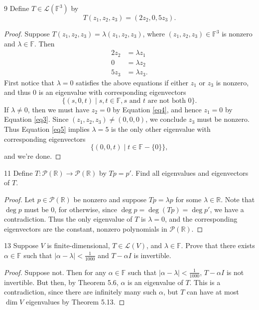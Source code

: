 \documentclass[11pt]{extarticle}
\newenvironment{problem}[1]{\begin{prob*}{#1}{}}{\end{prob*}}
\newcommand{\R}{\mathbb{R}}
\newcommand{\F}{\mathbb{F}}
\newcommand{\poly}{\mathcal{P}}
\newcommand{\Hom}{\mathcal{L}}
\begin{document}
\begin{problem}{9}
Define $T\in\Hom\left(\F^3\right)$ by
\begin{equation*}
T(z_1, z_2, z_3) = (2z_2, 0, 5z_3).
\end{equation*}
\end{problem}
\begin{proof}
Suppose $T(z_1, z_2, z_3) = \lambda(z_1,z_2,z_3)$, where $(z_1,z_2, z_3)\in\F^3$ is nonzero and $\lambda\in\F$.  Then
\begin{align}
2z_2 &= \lambda z_1\label{eq3} \\
0 &= \lambda z_2 \label{eq4} \\
5z_3 &= \lambda z_3. \label{eq5} 
\end{align}
First notice that $\lambda = 0$ satisfies the above equations if either $z_1$ or $z_3$ is nonzero, and thus $0$ is an eigenvalue with corresponding eigenvectors 
\begin{equation*}
\{(s, 0, t)\mid s,t\in\F, s\text{ and }t\text{ are not both }0\}.
\end{equation*}  
If $\lambda\neq 0$, then we must have $z_2 = 0$ by Equation \ref{eq4}, and hence $z_1 = 0$ by Equation \ref{eq3}.  Since $(z_1,z_2, z_3)\neq (0, 0, 0)$, we conclude $z_3$ must be nonzero.  Thus Equation \ref{eq5} implies $\lambda = 5$ is the only other eigenvalue with corresponding eigenvectors
\begin{equation*} 
\{(0, 0, t)\mid t\in\F-\{0\}\},
\end{equation*}
and we're done.
\end{proof}

\begin{problem}{11}
Define $T:\poly(\R)\to\poly(\R)$ by $Tp = p'$.  Find all eigenvalues and eigenvectors of $T$.
\end{problem}
\begin{proof}
Let $p\in\poly(\R)$ be nonzero and suppose $Tp = \lambda p$ for some $\lambda\in\R$.  Note that $\deg p$ must be $0$, for otherwise, since $\deg p = \deg(Tp) = \deg p'$, we have a contradiction.  Thus the only eigenvalue of $T$ is $\lambda = 0$, and the corresponding eigenvectors are the constant, nonzero polynomials in $\poly(\R)$.  
\end{proof}

\begin{problem}{13}
Suppose $V$ is finite-dimensional, $T\in\Hom(V)$, and $\lambda\in\F$.  Prove that there exists $\alpha\in\F$ such that $\left|\alpha-\lambda\right| < \frac{1}{1000}$ and $T-\alpha I$ is invertible.
\end{problem}
\begin{proof}
Suppose not.  Then for any $\alpha\in\F$ such that $\left|\alpha-\lambda\right| < \frac{1}{1000}$, $T - \alpha I$ is not invertible.  But then, by Theorem 5.6, $\alpha$ is an eigenvalue of $T$.  This is a contradiction, since there are infinitely many such $\alpha$, but $T$ can have at most $\dim V$ eigenvalues by Theorem 5.13. 
\end{proof} 
\end{document}

